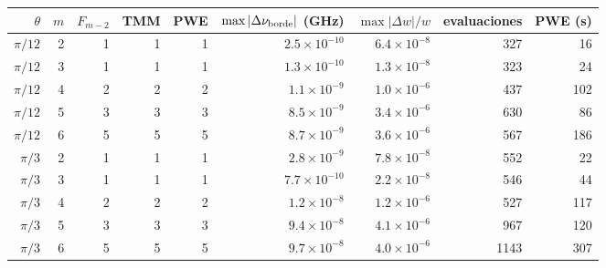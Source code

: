 \begin{tabular}{rrrrrrrrr}
\toprule
$\theta$ & $m$ & $F_{m-2}$ & TMM & PWE & $\max|\Delta\nu_{\rm borde}|$ (GHz) & $\max|\Delta w|/w$ & evaluaciones & PWE (s) \\
\midrule
$\pi/12$ & 2 & 1 & 1 & 1 & $2.5\times10^{-10}$ & $6.4\times10^{-8}$ & 327 & 16 \\
$\pi/12$ & 3 & 1 & 1 & 1 & $1.3\times10^{-10}$ & $1.3\times10^{-8}$ & 323 & 24 \\
$\pi/12$ & 4 & 2 & 2 & 2 & $1.1\times10^{-9}$ & $1.0\times10^{-6}$ & 437 & 102 \\
$\pi/12$ & 5 & 3 & 3 & 3 & $8.5\times10^{-9}$ & $3.4\times10^{-6}$ & 630 & 86 \\
$\pi/12$ & 6 & 5 & 5 & 5 & $8.7\times10^{-9}$ & $3.6\times10^{-6}$ & 567 & 186 \\
$\pi/3$ & 2 & 1 & 1 & 1 & $2.8\times10^{-9}$ & $7.8\times10^{-8}$ & 552 & 22 \\
$\pi/3$ & 3 & 1 & 1 & 1 & $7.7\times10^{-10}$ & $2.2\times10^{-8}$ & 546 & 44 \\
$\pi/3$ & 4 & 2 & 2 & 2 & $1.2\times10^{-8}$ & $1.2\times10^{-6}$ & 527 & 117 \\
$\pi/3$ & 5 & 3 & 3 & 3 & $9.4\times10^{-8}$ & $4.1\times10^{-6}$ & 967 & 120 \\
$\pi/3$ & 6 & 5 & 5 & 5 & $9.7\times10^{-8}$ & $4.0\times10^{-6}$ & 1143 & 307 \\
\bottomrule
\end{tabular}
